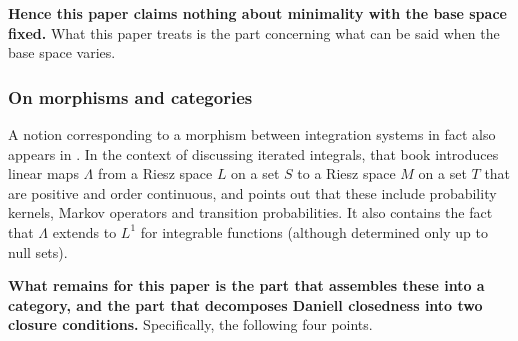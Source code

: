 \textbf{Hence this paper claims nothing about minimality with the base space
fixed.}
What this paper treats is the part concerning what can be said when the base
space varies.

\subsubsection{On morphisms and categories}

A notion corresponding to a morphism between integration systems in fact also
appears in \cite{Yamagami}.
In the context of discussing iterated integrals, that book introduces linear
maps $\Lambda$ from a Riesz space $L$ on a set $S$ to a Riesz space $M$ on a set
$T$ that are positive and order continuous, and points out that these include
probability kernels, Markov operators and transition probabilities.
It also contains the fact that $\Lambda$ extends to $L^1$ for integrable
functions (although determined only up to null sets).

\textbf{What remains for this paper is the part that assembles these into a
category, and the part that decomposes Daniell closedness into two closure
conditions.}
Specifically, the following four points.

